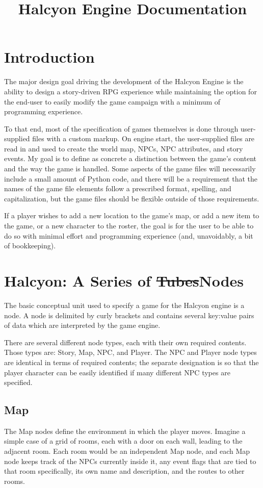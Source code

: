 \documentclass[11pt]{article}
\begin{document}
\title{Halcyon Engine Documentation}
\date{}
\maketitle{}

\section{Introduction}
The major design goal driving the development of the Halcyon Engine is the ability to design a story-driven RPG experience while maintaining the option for the end-user to easily modify the game campaign with a minimum of programming experience.

To that end, most of the specification of games themselves is done through user-supplied files with a custom markup.
On engine start, the user-supplied files are read in and used to create the world map, NPCs, NPC attributes, and story events.
My goal is to define as concrete a distinction between the game's content and the way the game is handled.
Some aspects of the game files will necessarily include a small amount of Python code, and there will be a requirement that the names of the game file elements follow a prescribed format, spelling, and capitalization, but the game files should be flexible outside of those requirements.

If a player wishes to add a new location to the game's map, or add a new item to the game, or a new character to the roster, the goal is for the user to be able to do so with minimal effort and programming experience (and, unavoidably, a bit of bookkeeping).
\section{Halcyon: A Series of \sout{Tubes}Nodes}
The basic conceptual unit used to specify a game for the Halcyon engine is a node.
A node is delimited by curly brackets and contains several key:value pairs of data which are interpreted by the game engine.

There are several different node types, each with their own required contents.
Those types are: Story, Map, NPC, and Player.
The NPC and Player node types are identical in terms of required contents; the separate designation is so that the player character can be easily identified if many different NPC types are specified.

\subsection{Map}
The Map nodes define the environment in which the player moves.
Imagine a simple case of a grid of rooms, each with a door on each wall, leading to the adjacent room.
Each room would be an independent Map node, and each Map node keeps track of the NPCs currently inside it, any event flags that are tied to that room specifically, its own name and description, and the routes to other rooms.
\end{document}
